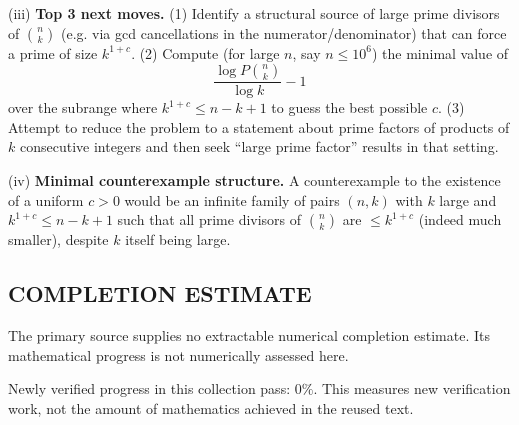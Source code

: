 (iii) \textbf{Top 3 next moves.}
(1) Identify a structural source of large prime divisors of $\binom{n}{k}$ (e.g. via gcd cancellations in the numerator/denominator) that can force a prime of size $k^{1+c}$.
(2) Compute (for large $n$, say $n\le 10^6$) the minimal value of
\[\frac{\log P\!\binom{n}{k}}{\log k}-1
\]
over the subrange where $k^{1+c}\le n-k+1$ to guess the best possible $c$.
(3) Attempt to reduce the problem to a statement about prime factors of products of $k$ consecutive integers and then seek ``large prime factor'' results in that setting.

(iv) \textbf{Minimal counterexample structure.}
A counterexample to the existence of a uniform $c>0$ would be an infinite family of pairs $(n,k)$ with $k$ large and $k^{1+c}\le n-k+1$ such that all prime divisors of $\binom{n}{k}$ are $\le k^{1+c}$ (indeed much smaller), despite $k$ itself being large.




\subsection*{COMPLETION ESTIMATE}
The primary source supplies no extractable numerical completion estimate. Its mathematical progress is not numerically assessed here.

Newly verified progress in this collection pass: $0\%$. This measures new verification work, not the amount of mathematics achieved in the reused text.
